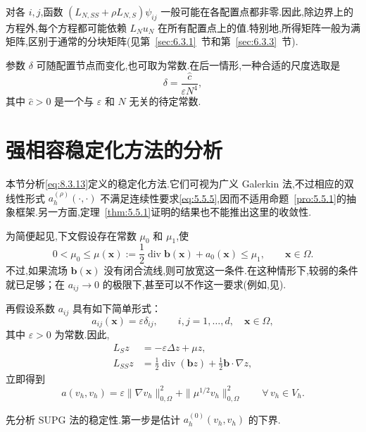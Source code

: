 对各 \(i,j\),函数 \((L_{N,SS}+\rho L_{N,S})\psi_{ij}\) 一般可能在各配置点都非零.因此,除边界上的方程外,每个方程都可能依赖 \(L_Nu_N\) 在所有配置点上的值.特别地,所得矩阵一般为满矩阵,区别于通常的分块矩阵(见第~\ref{sec:6.3.1}~节和第~\ref{sec:6.3.3}~节).

参数 \(\delta\) 可随配置节点而变化,也可取为常数.在后一情形,一种合适的尺度选取是
\[
  \delta=\frac{\widehat c}{\varepsilon N^4},
\]
其中 \(\widehat c>0\) 是一个与 \(\varepsilon\) 和 \(N\) 无关的待定常数.

\section{强相容稳定化方法的分析}\label{sec:8.4}

本节分析\eqref{eq:8.3.13}定义的稳定化方法.它们可视为广义 Galerkin 法,不过相应的双线性形式 \(a_h^{(\rho)}(\cdot,\cdot)\) 不满足连续性要求\eqref{eq:5.5.5},因而不适用命题~\ref{pro:5.5.1}的抽象框架.另一方面,定理~\ref{thm:5.5.1}证明的结果也不能推出这里的收敛性.

为简便起见,下文假设存在常数 \(\mu_0\) 和 \(\mu_1\),使
\begin{equation}\label{eq:8.4.1}
  0<\mu_0\le\mu(\boldsymbol{x}):=\frac12\operatorname{div}\boldsymbol{b}(\boldsymbol{x})+a_0(\boldsymbol{x})
       \le\mu_1,\qquad \boldsymbol{x}\in\Omega.
\end{equation}
不过,如果流场 \(\boldsymbol{b}(\boldsymbol{x})\) 没有闭合流线,则可放宽这一条件.在这种情形下,较弱的条件就已足够；在 \(a_{ij}\to0\) 的极限下,甚至可以不作这一要求(例如,见).

再假设系数 \(a_{ij}\) 具有如下简单形式：
\[
  a_{ij}(\boldsymbol{x})=\varepsilon\delta_{ij},\qquad
  i,j=1,\ldots,d,\quad\boldsymbol{x}\in\Omega,
\]
其中 \(\varepsilon>0\) 为常数.因此,
\[
  \begin{aligned}
    L_Sz&=-\varepsilon\Delta z+\mu z,\\
    L_{SS}z&=\tfrac12\operatorname{div}(\boldsymbol{b}z)+\tfrac12\boldsymbol{b}\cdot\nabla z,
  \end{aligned}
\]
立即得到
\begin{equation}\label{eq:8.4.2}
  a(v_h,v_h)=\varepsilon\|\nabla v_h\|_{0,\Omega}^2+
              \|\mu^{1/2}v_h\|_{0,\Omega}^2\qquad\forall\,v_h\in V_h.
\end{equation}

先分析 SUPG 法的稳定性.第一步是估计 \(a_h^{(0)}(v_h,v_h)\) 的下界.

